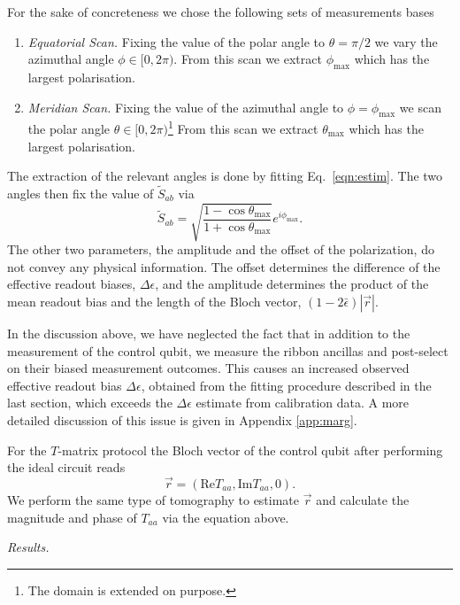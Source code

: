 \documentclass[two column]{article}
\begin{document}
For the sake of concreteness we chose the following sets of measurements bases  \begin{enumerate}
    \item \emph{Equatorial Scan.} Fixing the value of the polar angle to $\theta = \pi/2$ we vary the azimuthal angle $\phi \in [0, 2\pi)$. From this scan we extract $\phi_{\text{max}}$ which has the largest polarisation.
    \item \emph{Meridian Scan.} Fixing the value of the azimuthal angle to $\phi = \phi_{\text{max}}$ we scan the polar angle $\theta \in [0, 2\pi)$\footnote{The domain is extended on purpose.} From this scan we extract $\theta_{\text{max}}$ which has the largest polarisation.
\end{enumerate}
The extraction of the relevant angles is done by fitting Eq.~\eqref{eqn:estim}.
The two angles then fix the value of $\tilde{S}_{ab}$ via $$\tilde{S}_{ab} = \sqrt{\frac{1-\cos{\theta_{\text{max}}}}{1+\cos{\theta_{\text{max}}}}}e^{i\phi_{\text{max}}}.$$
The other two parameters, the amplitude and the offset of the polarization, do not convey any physical information. The offset determines the difference of the effective readout biases, $\Delta\epsilon$, and the amplitude determines the product of the mean readout bias and the length of the Bloch vector, $(1-2\bar{\epsilon})|\vec{r}|$.


In the discussion above, we have neglected the fact that in addition to the measurement of the control qubit, we measure the ribbon ancillas and post-select on their biased measurement outcomes. This causes an increased observed effective readout bias $\Delta \epsilon$, obtained from the fitting procedure described in the last section, which exceeds the $\Delta \epsilon$ estimate from calibration data. A more detailed discussion of this issue is given in Appendix \ref{app:marg}. 


For the $T$-matrix protocol the Bloch vector of the control qubit after performing the ideal circuit reads
\begin{equation}
    \vec{r} = \left(  \text{Re}{T}_{aa}, \text{Im}{T}_{aa}, 0 \right).\label{eqn:blochT} 
\end{equation}
We perform the same type of tomography to estimate $\vec r$ and calculate the magnitude and phase of $T_{aa}$ via the equation above.




\emph{Results.}
\end{document}
